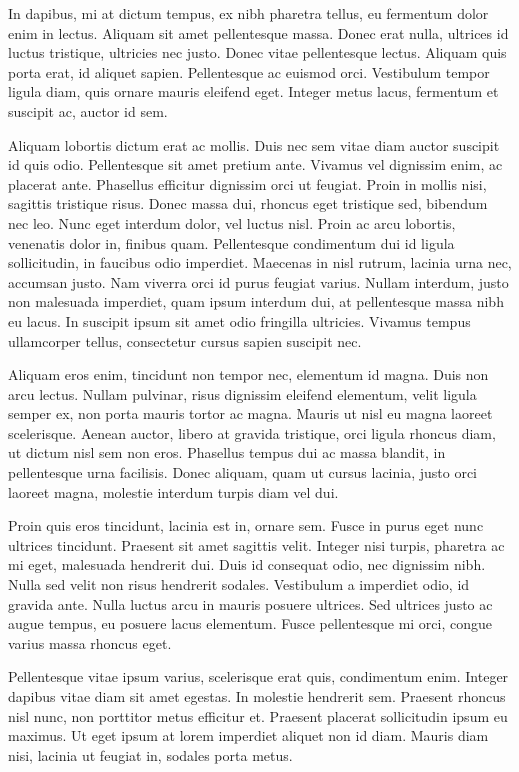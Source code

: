 In dapibus, mi at dictum tempus, ex nibh pharetra tellus, eu fermentum dolor enim in lectus. Aliquam sit amet pellentesque massa. Donec erat nulla, ultrices id luctus tristique, ultricies nec justo. Donec vitae pellentesque lectus. Aliquam quis porta erat, id aliquet sapien. Pellentesque ac euismod orci. Vestibulum tempor ligula diam, quis ornare mauris eleifend eget. Integer metus lacus, fermentum et suscipit ac, auctor id sem.

Aliquam lobortis dictum erat ac mollis. Duis nec sem vitae diam auctor suscipit id quis odio. Pellentesque sit amet pretium ante. Vivamus vel dignissim enim, ac placerat ante. Phasellus efficitur dignissim orci ut feugiat. Proin in mollis nisi, sagittis tristique risus. Donec massa dui, rhoncus eget tristique sed, bibendum nec leo. Nunc eget interdum dolor, vel luctus nisl. Proin ac arcu lobortis, venenatis dolor in, finibus quam. Pellentesque condimentum dui id ligula sollicitudin, in faucibus odio imperdiet. Maecenas in nisl rutrum, lacinia urna nec, accumsan justo. Nam viverra orci id purus feugiat varius. Nullam interdum, justo non malesuada imperdiet, quam ipsum interdum dui, at pellentesque massa nibh eu lacus. In suscipit ipsum sit amet odio fringilla ultricies. Vivamus tempus ullamcorper tellus, consectetur cursus sapien suscipit nec.

Aliquam eros enim, tincidunt non tempor nec, elementum id magna. Duis non arcu lectus. Nullam pulvinar, risus dignissim eleifend elementum, velit ligula semper ex, non porta mauris tortor ac magna. Mauris ut nisl eu magna laoreet scelerisque. Aenean auctor, libero at gravida tristique, orci ligula rhoncus diam, ut dictum nisl sem non eros. Phasellus tempus dui ac massa blandit, in pellentesque urna facilisis. Donec aliquam, quam ut cursus lacinia, justo orci laoreet magna, molestie interdum turpis diam vel dui.

Proin quis eros tincidunt, lacinia est in, ornare sem. Fusce in purus eget nunc ultrices tincidunt. Praesent sit amet sagittis velit. Integer nisi turpis, pharetra ac mi eget, malesuada hendrerit dui. Duis id consequat odio, nec dignissim nibh. Nulla sed velit non risus hendrerit sodales. Vestibulum a imperdiet odio, id gravida ante. Nulla luctus arcu in mauris posuere ultrices. Sed ultrices justo ac augue tempus, eu posuere lacus elementum. Fusce pellentesque mi orci, congue varius massa rhoncus eget.

Pellentesque vitae ipsum varius, scelerisque erat quis, condimentum enim. Integer dapibus vitae diam sit amet egestas. In molestie hendrerit sem. Praesent rhoncus nisl nunc, non porttitor metus efficitur et. Praesent placerat sollicitudin ipsum eu maximus. Ut eget ipsum at lorem imperdiet aliquet non id diam. Mauris diam nisi, lacinia ut feugiat in, sodales porta metus.

